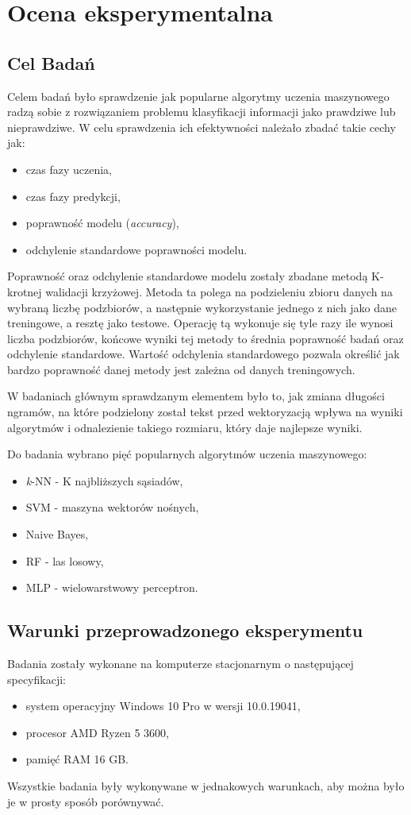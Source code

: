 \chapter{Ocena eksperymentalna}
\section{Cel Badań}
Celem badań było sprawdzenie jak popularne algorytmy uczenia maszynowego radzą sobie z rozwiązaniem problemu 
klasyfikacji informacji jako prawdziwe lub nieprawdziwe. W celu sprawdzenia ich efektywności należało zbadać
takie cechy jak:
\begin{itemize}
    \item czas fazy uczenia,
    \item czas fazy predykcji,
    \item poprawność modelu (\textit{accuracy}),
    \item odchylenie standardowe poprawności modelu.
\end{itemize}
Poprawność oraz odchylenie standardowe modelu zostały zbadane metodą K-krotnej walidacji krzyżowej. 
Metoda ta polega na podzieleniu zbioru danych na wybraną liczbę podzbiorów, a następnie wykorzystanie jednego
z nich jako dane treningowe, a resztę jako testowe. Operację tą wykonuje się tyle razy ile wynosi liczba podzbiorów,
końcowe wyniki tej metody to średnia poprawność badań oraz odchylenie standardowe. Wartość odchylenia standardowego
pozwala określić jak bardzo poprawność danej metody jest zależna od danych treningowych. 


W badaniach głównym sprawdzanym elementem było to, jak zmiana długości ngramów, na które podzielony
został tekst przed wektoryzacją wpływa na wyniki algorytmów i odnalezienie takiego rozmiaru, który
daje najlepsze wyniki. 

Do badania wybrano pięć popularnych algorytmów uczenia maszynowego: 
\begin{itemize}
    \item \textit{k}-NN - K najbliższych sąsiadów,
    \item SVM - maszyna wektorów nośnych,
    \item Naive Bayes,
    \item RF - las losowy,
    \item MLP - wielowarstwowy perceptron.
\end{itemize} 
\section{Warunki przeprowadzonego eksperymentu}
Badania zostały wykonane na komputerze stacjonarnym o następującej specyfikacji:
\begin{itemize}
    \item system operacyjny Windows 10 Pro w wersji 10.0.19041,
    \item procesor AMD Ryzen 5 3600,
    \item pamięć RAM 16 GB.
\end{itemize}
Wszystkie badania były wykonywane w jednakowych warunkach, aby można było 
je w prosty sposób porównywać. 

